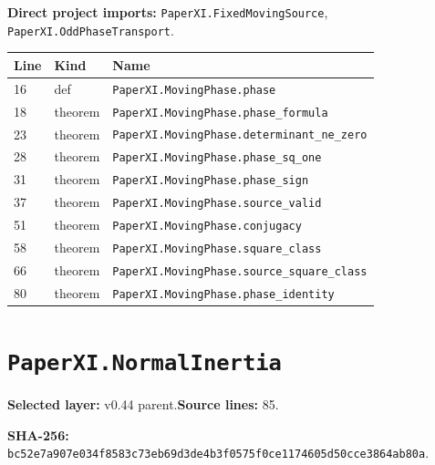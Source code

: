 \documentclass[10pt,oneside]{book}
\begin{document}
\textbf{Direct project imports:} \nolinkurl{PaperXI.FixedMovingSource}, \nolinkurl{PaperXI.OddPhaseTransport}.

\begin{longtable}{@{}p{}p{}p{}@{}}\toprule Line&Kind&Name\\\midrule\endhead

16&def&\nolinkurl{PaperXI.MovingPhase.phase}\\

18&theorem&\nolinkurl{PaperXI.MovingPhase.phase_formula}\\

23&theorem&\nolinkurl{PaperXI.MovingPhase.determinant_ne_zero}\\

28&theorem&\nolinkurl{PaperXI.MovingPhase.phase_sq_one}\\

31&theorem&\nolinkurl{PaperXI.MovingPhase.phase_sign}\\

37&theorem&\nolinkurl{PaperXI.MovingPhase.source_valid}\\

51&theorem&\nolinkurl{PaperXI.MovingPhase.conjugacy}\\

58&theorem&\nolinkurl{PaperXI.MovingPhase.square_class}\\

66&theorem&\nolinkurl{PaperXI.MovingPhase.source_square_class}\\

80&theorem&\nolinkurl{PaperXI.MovingPhase.phase_identity}\\

\bottomrule\end{longtable}

\section{\texorpdfstring{\nolinkurl{PaperXI.NormalInertia}}{PaperXI.NormalInertia}}\label{module:PaperXI.NormalInertia}

\textbf{Selected layer:} v0.44 parent.\quad\textbf{Source lines:} 85.\par\textbf{SHA-256:} {\scriptsize\nolinkurl{bc52e7a907e034f8583c73eb69d3de4b3f0575f0ce1174605d50cce3864ab80a}}.

\end{document}
